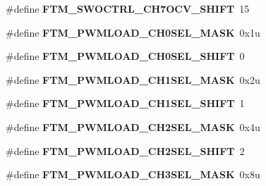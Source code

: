 \begin{DoxyCompactItemize}
\item 
\#define {\bfseries F\+T\+M\+\_\+\+S\+W\+O\+C\+T\+R\+L\+\_\+\+C\+H7\+O\+C\+V\+\_\+\+S\+H\+I\+FT}~15\hypertarget{group__FTM__Register__Masks_ga6319ffea29243485dcc140b0ef64002c}{}\label{group__FTM__Register__Masks_ga6319ffea29243485dcc140b0ef64002c}

\item 
\#define {\bfseries F\+T\+M\+\_\+\+P\+W\+M\+L\+O\+A\+D\+\_\+\+C\+H0\+S\+E\+L\+\_\+\+M\+A\+SK}~0x1u\hypertarget{group__FTM__Register__Masks_ga3aed163f12371474717169636b2d9620}{}\label{group__FTM__Register__Masks_ga3aed163f12371474717169636b2d9620}

\item 
\#define {\bfseries F\+T\+M\+\_\+\+P\+W\+M\+L\+O\+A\+D\+\_\+\+C\+H0\+S\+E\+L\+\_\+\+S\+H\+I\+FT}~0\hypertarget{group__FTM__Register__Masks_ga02d773d77ba9c505275e876cd180cd79}{}\label{group__FTM__Register__Masks_ga02d773d77ba9c505275e876cd180cd79}

\item 
\#define {\bfseries F\+T\+M\+\_\+\+P\+W\+M\+L\+O\+A\+D\+\_\+\+C\+H1\+S\+E\+L\+\_\+\+M\+A\+SK}~0x2u\hypertarget{group__FTM__Register__Masks_ga01a9bbb1d2eca61c95255992a5a13e19}{}\label{group__FTM__Register__Masks_ga01a9bbb1d2eca61c95255992a5a13e19}

\item 
\#define {\bfseries F\+T\+M\+\_\+\+P\+W\+M\+L\+O\+A\+D\+\_\+\+C\+H1\+S\+E\+L\+\_\+\+S\+H\+I\+FT}~1\hypertarget{group__FTM__Register__Masks_gae4943b2c121fcb66763b08960f09bff4}{}\label{group__FTM__Register__Masks_gae4943b2c121fcb66763b08960f09bff4}

\item 
\#define {\bfseries F\+T\+M\+\_\+\+P\+W\+M\+L\+O\+A\+D\+\_\+\+C\+H2\+S\+E\+L\+\_\+\+M\+A\+SK}~0x4u\hypertarget{group__FTM__Register__Masks_gabd7f8ac1fa597d6b97b85926ae9e6fec}{}\label{group__FTM__Register__Masks_gabd7f8ac1fa597d6b97b85926ae9e6fec}

\item 
\#define {\bfseries F\+T\+M\+\_\+\+P\+W\+M\+L\+O\+A\+D\+\_\+\+C\+H2\+S\+E\+L\+\_\+\+S\+H\+I\+FT}~2\hypertarget{group__FTM__Register__Masks_ga477fae93760ebabafd41a6be108c41a1}{}\label{group__FTM__Register__Masks_ga477fae93760ebabafd41a6be108c41a1}

\item 
\#define {\bfseries F\+T\+M\+\_\+\+P\+W\+M\+L\+O\+A\+D\+\_\+\+C\+H3\+S\+E\+L\+\_\+\+M\+A\+SK}~0x8u\hypertarget{group__FTM__Register__Masks_gacbe9716a0b6c45b6e509f4060145ecc0}{}\label{group__FTM__Register__Masks_gacbe9716a0b6c45b6e509f4060145ecc0}


\end{DoxyCompactItemize}

